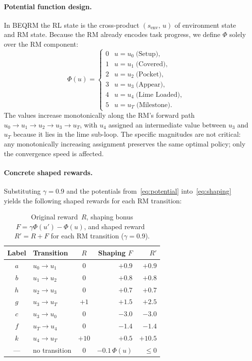 \documentclass[letterpaper, 10 pt, conference]{ieeeconf}  %
\begin{document}
\paragraph{Potential function design.}
In BEQRM the RL state is the cross-product $(s_{\mathrm{env}},\, u)$ of environment state and RM state.  Because the RM already encodes task progress, we define $\Phi$ solely over the RM component:
\begin{equation}
\label{eq:potential}
\Phi(u) =
\begin{cases}
0 & u = u_0 \;\text{(Setup)},\\
1 & u = u_1 \;\text{(Covered)},\\
2 & u = u_2 \;\text{(Pocket)},\\
3 & u = u_3 \;\text{(Appear)},\\
4 & u = u_4 \;\text{(Lime Loaded)},\\
5 & u = u_T \;\text{(Milestone)}.
\end{cases}
\end{equation}
The values increase monotonically along the RM's forward path $u_0 \!\to\! u_1 \!\to\! u_2 \!\to\! u_3 \!\to\! u_T$, with $u_4$ assigned an intermediate value between $u_3$ and $u_T$ because it lies in the lime sub-loop.
The specific magnitudes are not critical: any monotonically increasing assignment preserves the same optimal policy; only the convergence speed is affected.

\paragraph{Concrete shaped rewards.}
Substituting $\gamma = 0.9$ and the potentials from~\eqref{eq:potential} into~\eqref{eq:shaping} yields the following shaped rewards for each RM transition:

\begin{table}[ht]
\centering\small
\begin{tabular}{clcrr}
\toprule
\textbf{Label} & \textbf{Transition} & $R$ & \textbf{Shaping} $F$ & $R'$ \\
\midrule
$a$ & $u_0 \to u_1$ & $0$ & $+0.9$ & $+0.9$ \\
$b$ & $u_1 \to u_2$ & $0$ & $+0.8$ & $+0.8$ \\
$h$ & $u_2 \to u_3$ & $0$ & $+0.7$ & $+0.7$ \\
$g$ & $u_3 \to u_T$ & $+1$ & $+1.5$ & $+2.5$ \\
$c$ & $u_3 \to u_0$ & $0$ & $-3.0$ & $-3.0$ \\
$f$ & $u_T \to u_4$ & $0$ & $-1.4$ & $-1.4$ \\
$k$ & $u_4 \to u_T$ & $+10$ & $+0.5$ & $+10.5$ \\
--- & no transition & $0$ & $-0.1\,\Phi(u)$ & $\leq 0$ \\
\bottomrule
\end{tabular}
\caption{Original reward~$R$, shaping bonus $F = \gamma\Phi(u') - \Phi(u)$, and shaped reward~$R' = R + F$ for each RM transition ($\gamma = 0.9$).}
\label{tab:shaped_rewards}
\end{table}
\end{document}
